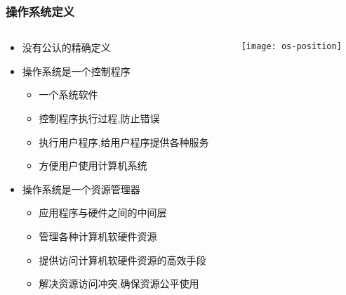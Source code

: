 \begin{frame}

\frametitle{操作系统定义}

\begin{columns}
\begin{column}{.7\linewidth}
	
\begin{itemize}
\item 没有公认的精确定义
\item 操作系统是一个控制程序
	\begin{itemize}
	\item 一个系统软件
	\item 控制程序执行过程,防止错误
	\item 执行用户程序,给用户程序提供各种服务
	\item 方便用户使用计算机系统
	\end{itemize}
	\item 操作系统是一个资源管理器
	\begin{itemize}
		\item 应用程序与硬件之间的中间层
		\item 管理各种计算机软硬件资源
		\item 提供访问计算机软硬件资源的高效手段
		\item 解决资源访问冲突,确保资源公平使用
	\end{itemize}
\end{itemize}

\end{column}

\begin{column}{.6\linewidth}

	\texttt{[image: os-position]}

\end{column}

\end{columns}

\end{frame}


